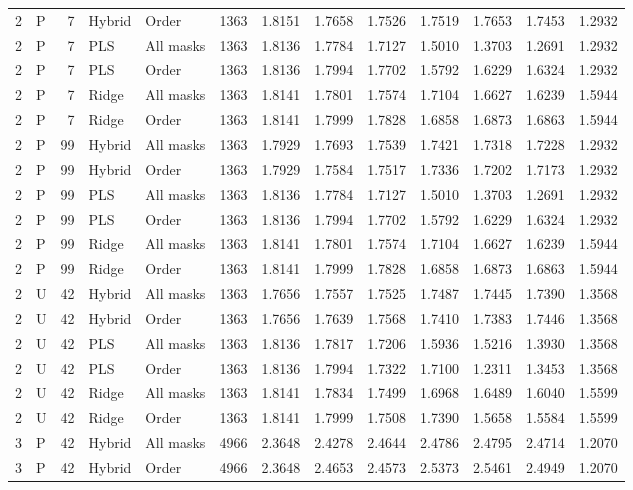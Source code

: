 \documentclass[10pt,a4paper]{article}
\begin{document}
\begin{landscape}
\begin{longtable}{rlrllrrrrrrrr}
2 & P & 7 & Hybrid & Order & 1363 & 1.8151 & 1.7658 & 1.7526 & 1.7519 & 1.7653 & 1.7453 & 1.2932 \\
2 & P & 7 & PLS & All masks & 1363 & 1.8136 & 1.7784 & 1.7127 & 1.5010 & 1.3703 & 1.2691 & 1.2932 \\
2 & P & 7 & PLS & Order & 1363 & 1.8136 & 1.7994 & 1.7702 & 1.5792 & 1.6229 & 1.6324 & 1.2932 \\
2 & P & 7 & Ridge & All masks & 1363 & 1.8141 & 1.7801 & 1.7574 & 1.7104 & 1.6627 & 1.6239 & 1.5944 \\
2 & P & 7 & Ridge & Order & 1363 & 1.8141 & 1.7999 & 1.7828 & 1.6858 & 1.6873 & 1.6863 & 1.5944 \\
2 & P & 99 & Hybrid & All masks & 1363 & 1.7929 & 1.7693 & 1.7539 & 1.7421 & 1.7318 & 1.7228 & 1.2932 \\
2 & P & 99 & Hybrid & Order & 1363 & 1.7929 & 1.7584 & 1.7517 & 1.7336 & 1.7202 & 1.7173 & 1.2932 \\
2 & P & 99 & PLS & All masks & 1363 & 1.8136 & 1.7784 & 1.7127 & 1.5010 & 1.3703 & 1.2691 & 1.2932 \\
2 & P & 99 & PLS & Order & 1363 & 1.8136 & 1.7994 & 1.7702 & 1.5792 & 1.6229 & 1.6324 & 1.2932 \\
2 & P & 99 & Ridge & All masks & 1363 & 1.8141 & 1.7801 & 1.7574 & 1.7104 & 1.6627 & 1.6239 & 1.5944 \\
2 & P & 99 & Ridge & Order & 1363 & 1.8141 & 1.7999 & 1.7828 & 1.6858 & 1.6873 & 1.6863 & 1.5944 \\
2 & U & 42 & Hybrid & All masks & 1363 & 1.7656 & 1.7557 & 1.7525 & 1.7487 & 1.7445 & 1.7390 & 1.3568 \\
2 & U & 42 & Hybrid & Order & 1363 & 1.7656 & 1.7639 & 1.7568 & 1.7410 & 1.7383 & 1.7446 & 1.3568 \\
2 & U & 42 & PLS & All masks & 1363 & 1.8136 & 1.7817 & 1.7206 & 1.5936 & 1.5216 & 1.3930 & 1.3568 \\
2 & U & 42 & PLS & Order & 1363 & 1.8136 & 1.7994 & 1.7322 & 1.7100 & 1.2311 & 1.3453 & 1.3568 \\
2 & U & 42 & Ridge & All masks & 1363 & 1.8141 & 1.7834 & 1.7499 & 1.6968 & 1.6489 & 1.6040 & 1.5599 \\
2 & U & 42 & Ridge & Order & 1363 & 1.8141 & 1.7999 & 1.7508 & 1.7390 & 1.5658 & 1.5584 & 1.5599 \\
3 & P & 42 & Hybrid & All masks & 4966 & 2.3648 & 2.4278 & 2.4644 & 2.4786 & 2.4795 & 2.4714 & 1.2070 \\
3 & P & 42 & Hybrid & Order & 4966 & 2.3648 & 2.4653 & 2.4573 & 2.5373 & 2.5461 & 2.4949 & 1.2070 \\

\end{longtable}
\end{landscape}
\end{document}

